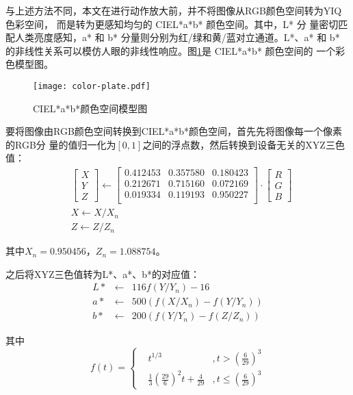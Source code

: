 与上述方法不同，本文在进行动作放大前，并不将图像从RGB颜色空间转为YIQ色彩空间，
而是转为更感知均匀的 CIEL*a*b* 颜色空间。其中，L* 分
量密切匹配人类亮度感知，a* 和 b* 分量则分别为红/绿和黄/蓝对立通道。L*、a* 和 b*
的非线性关系可以模仿人眼的非线性响应。图\ref{fig:cielab}是 CIEL*a*b* 颜色空间的
一个彩色模型图。

\begin{figure}[htbp]
  \centering
  \texttt{[image: color-plate.pdf]}
  \caption{CIEL*a*b*颜色空间模型图}
  \label{fig:cielab}
\end{figure}

要将图像由RGB颜色空间转换到CIEL*a*b*颜色空间，首先先将图像每一个像素的RGB分
量的值归一化为$[0, 1]$之间的浮点数，然后转换到设备无关的XYZ三色值：
\begin{eqnarray*}
  & \begin{bmatrix} X \\ Y \\ Z \end{bmatrix} \leftarrow
  \begin{bmatrix}
    0.412453 & 0.357580 & 0.180423 \\
    0.212671 & 0.715160 & 0.072169 \\
    0.019334 & 0.119193 & 0.950227 \\
  \end{bmatrix}
  \cdot
  \begin{bmatrix}
    R \\ G \\ B
  \end{bmatrix}\\
  & X \leftarrow X/X_n\\
  & Z \leftarrow Z/Z_n
\end{eqnarray*}

其中$X_n = 0.950456$，$Z_n = 1.088754$。

之后将XYZ三色值转为L*、a*、b*的对应值：
\begin{eqnarray*}
  L* & \leftarrow & 116f(Y/Y_n)-16\\
  a* & \leftarrow & 500(f(X/X_n)-f(Y/Y_n))\\
  b* & \leftarrow & 200(f(Y/Y_n)-f(Z/Z_n))
\end{eqnarray*}

其中
\begin{displaymath}
  f(t)=\left\{
    \begin{aligned}
      & t^{1/3} &, t > (\frac{6}{29})^3\\
      & \frac{1}{3}(\frac{29}{6})^2t + \frac{4}{29} &, t \le (\frac{6}{29})^3
    \end{aligned}
\right.
\end{displaymath}


